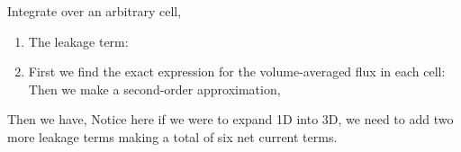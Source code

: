 \documentclass{school-22.211-notes}
\begin{document}
Integrate over an arbitrary cell, 
\begin{enumerate}
\item The leakage term: 
\item First we find the exact expression for the volume-averaged flux in each cell: 
Then we make a second-order approximation, 
\end{enumerate}
Then we have,
Notice here if we were to expand 1D into 3D, we need to add two more leakage terms making a total of six net current terms. 
\end{document}
